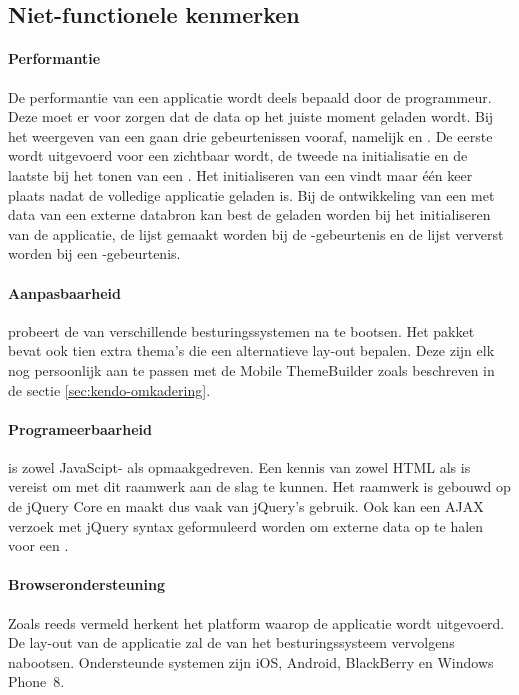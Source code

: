 \subsection{Niet-functionele kenmerken}
\label{sec:kendo-niet-functioneel}

\paragraph{Performantie}
De performantie van een \kendo{} applicatie wordt deels bepaald door de programmeur.
Deze moet er voor zorgen dat de data op het juiste moment geladen wordt.
Bij het weergeven van een  gaan drie gebeurtenissen vooraf,  namelijk  en .
De eerste wordt uitgevoerd voor een  zichtbaar wordt,  de tweede na initialisatie en de laatste bij het tonen van een .
Het initialiseren van een  vindt maar één keer plaats nadat de volledige applicatie geladen is.
Bij de ontwikkeling van een  met data van een externe databron kan best de  geladen worden bij het initialiseren van de applicatie,  de lijst gemaakt worden bij de -gebeurtenis en de lijst ververst worden bij een -gebeurtenis.

\paragraph{Aanpasbaarheid}
\kendo{} probeert de  van verschillende besturingssystemen na te bootsen.
Het \kendo{} pakket bevat ook tien extra thema's die een alternatieve lay-out bepalen.
Deze zijn elk nog persoonlijk aan te passen met de Mobile ThemeBuilder zoals beschreven in de sectie \ref{sec:kendo-omkadering}.

\paragraph{Programeerbaarheid}
\kendo{} is zowel JavaScipt- als opmaakgedreven.
Een kennis van zowel HTML als \js{} is vereist om met dit raamwerk aan de slag te kunnen.
Het raamwerk is gebouwd op de jQuery Core en maakt dus vaak van jQuery's  gebruik.
Ook kan een AJAX verzoek met jQuery syntax geformuleerd worden om externe data op te halen voor een .

\paragraph{Browserondersteuning}
Zoals reeds vermeld herkent \kendo{} het platform waarop de applicatie wordt uitgevoerd.
De lay-out van de applicatie zal de  van het besturingssysteem vervolgens nabootsen.
Ondersteunde systemen zijn iOS, Android, BlackBerry en Windows Phone~8.

